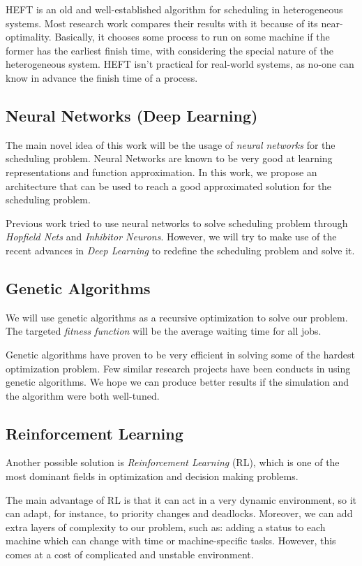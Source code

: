 \documentclass[twocolumn,11pt]{IEEEtran}
\begin{document}
    HEFT is an old and well-established algorithm for scheduling in heterogeneous systems. Most research work compares their results with it because of its near-optimality. Basically, it chooses some process to run on some machine if the former has the earliest finish time, with considering the special nature of the heterogeneous system. HEFT isn't practical for real-world systems, as no-one can know in advance the finish time of a process.

    \subsection{Neural Networks (Deep Learning)}
    The main novel idea of this work will be the usage of \emph{neural networks} for the scheduling problem. Neural Networks are known to be very good at learning representations and function approximation. In this work, we propose an architecture that can be used to reach a good approximated solution for the scheduling problem.
    
    Previous work tried to use neural networks to solve scheduling problem through \emph{Hopfield Nets} and \emph{Inhibitor Neurons}. However, we will try to make use of the recent advances in \emph{Deep Learning} to redefine the scheduling problem and solve it.
    
    \subsection{Genetic Algorithms}
    We will use genetic algorithms as a recursive optimization to solve our problem. The targeted \emph{fitness function} will be the average waiting time for all jobs. 
    
    Genetic algorithms have proven to be very efficient in solving some of the hardest optimization problem. Few similar research projects have been conducts in using genetic algorithms. We hope we can produce better results if the simulation and the algorithm were both well-tuned.

    \subsection{Reinforcement Learning}
    Another possible solution is \emph{Reinforcement Learning} (RL), which is one of the most dominant fields in optimization and decision making problems. 
    
    The main advantage of RL is that it can act in a very dynamic environment, so it can adapt, for instance, to priority changes and deadlocks. Moreover, we can add extra layers of complexity to our problem, such as: adding a status to each machine which can change with time or machine-specific tasks. However, this comes at a cost of complicated and unstable environment.
\end{document}
